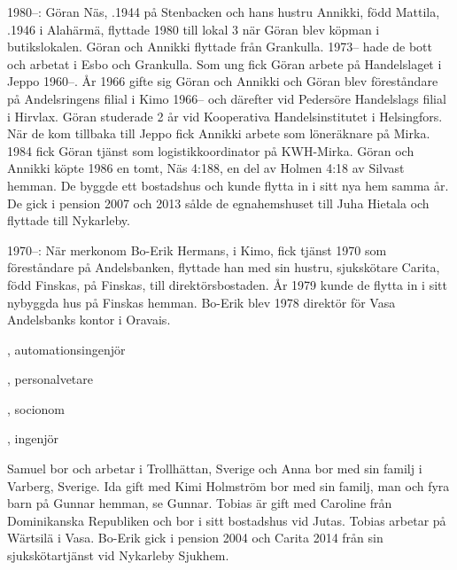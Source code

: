 1980--:
Göran Näs, .1944 på Stenbacken och hans hustru Annikki, född Mattila, .1946 i Alahärmä, flyttade 1980 till lokal 3 när Göran blev köpman i butikslokalen. Göran och Annikki flyttade från Grankulla. 1973-- hade de bott och arbetat i Esbo och Grankulla. Som ung fick Göran arbete på Handelslaget i Jeppo 1960--. År 1966 gifte sig Göran och Annikki och Göran blev föreståndare på Andelsringens filial i Kimo 1966-- och därefter vid Pedersöre Handelslags filial i Hirvlax. Göran studerade 2 år vid Kooperativa Handelsinstitutet i Helsingfors. När de 	kom tillbaka till Jeppo fick Annikki arbete som löneräknare på Mirka. 1984 fick Göran tjänst som logistikkoordinator på KWH-Mirka. Göran och Annikki köpte 1986 en tomt, Näs 4:188, en del av Holmen 4:18 av Silvast hemman. De byggde ett bostadshus och kunde flytta in i sitt nya hem samma år. De gick i pension 2007 och 2013 sålde de egnahemshuset till Juha Hietala och flyttade till Nykarleby.

1970--:
När merkonom Bo-Erik Hermans,  i Kimo, fick tjänst 1970	som föreståndare på Andelsbanken, flyttade han med sin hustru, sjukskötare Carita, född Finskas,  på Finskas, till direktörsbostaden. År 1979 kunde de flytta in i sitt nybyggda hus på Finskas hemman. Bo-Erik blev 1978 direktör för Vasa Andelsbanks kontor i Oravais.
\begin{jhchildren}
  \item {}, automationsingenjör
  \item {}, personalvetare
  \item {}, socionom
  \item {}, ingenjör
\end{jhchildren}
Samuel bor och arbetar i Trollhättan, Sverige och Anna bor med sin 	familj i Varberg, Sverige. Ida gift med Kimi Holmström bor med sin familj, man och fyra barn på Gunnar hemman, se Gunnar. Tobias är gift	med Caroline från Dominikanska Republiken och bor i sitt bostadshus vid Jutas. Tobias arbetar på Wärtsilä i Vasa. Bo-Erik gick i pension 2004 och Carita 2014 från sin sjukskötartjänst vid Nykarleby Sjukhem.



